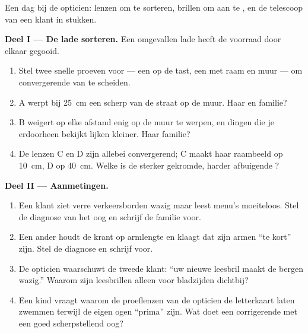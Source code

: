 \begin{problem}\label{pb:g8:lenses-images:1}
Een dag bij de opticien: lenzen om te sorteren, brillen om aan te
, en de telescoop van een klant in stukken.

\medskip\noindent\textbf{Deel I --- De lade sorteren.}
Een omgevallen lade heeft de voorraad door elkaar gegooid.
\begin{enumerate}
  \item Stel twee snelle proeven voor --- een op de tast, een met raam
        en muur --- om convergerende van  te
        scheiden.
  \item {} A werpt bij \qty{25}{cm} een scherp
         van de straat op de muur. Haar
         en familie?
  \item {} B weigert op elke afstand enig  op
        de muur te werpen, en dingen die je erdoorheen bekijkt lijken
        kleiner. Haar familie?
  \item De lenzen C en D zijn allebei convergerend; C maakt haar
        raambeeld op \qty{10}{cm}, D op \qty{40}{cm}. Welke is de
        sterker gekromde, harder afbuigende ?
\end{enumerate}

\medskip\noindent\textbf{Deel II --- Aanmetingen.}
\begin{enumerate}[resume]
  \item Een klant ziet verre verkeersborden wazig maar leest menu's
        moeiteloos. Stel de diagnose van het oog en schrijf de familie
        voor.
  \item Een ander houdt de krant op armlengte en klaagt dat zijn armen
        ``te kort'' zijn. Stel de diagnose en schrijf voor.
  \item De opticien waarschuwt de tweede klant: ``uw nieuwe leesbril
        maakt de bergen wazig.'' Waarom zijn leesbrillen alleen voor
        bladzijden dichtbij?
  \item Een kind vraagt waarom de proeflenzen van de opticien de
        letterkaart laten zwemmen terwijl de eigen ogen ``prima'' zijn.
        Wat doet een corrigerende  met een goed
        scherpstellend oog?
\end{enumerate}


\end{problem}
